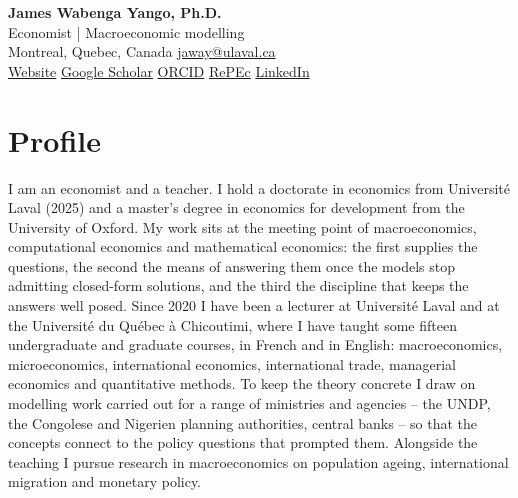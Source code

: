 \documentclass[11pt,letterpaper]{article}
\newcommand{\dotsep}{\;\textcolor{soft}{\textbullet}\;}
\begin{document}
\sloppy
\begin{center}
  {\selectfont\Huge\bfseries\color{accent} James Wabenga Yango, Ph.D.}\\[3pt]
  {\selectfont\large Economist \textcolor{soft}{|} Macroeconomic modelling}\\[6pt]
  {\small
    Montreal, Quebec, Canada \dotsep \href{mailto:jaway@ulaval.ca}{jaway@ulaval.ca}\\[2pt]
    \href{https://jamwab.github.io}{Website} \dotsep
    \href{https://scholar.google.com/citations?user=1d2zZn8AAAAJ}{Google Scholar} \dotsep
    \href{https://orcid.org/0000-0002-4675-4583}{ORCID} \dotsep
    \href{https://ideas.repec.org/f/pwa745.html}{RePEc} \dotsep
    \href{https://www.linkedin.com/in/james-wabenga-739a6641/}{LinkedIn}
  }
\end{center}
\vspace{0.2em}
\section{Profile}
I am an economist and a teacher. I hold a doctorate in economics from Université Laval (2025) and a master's degree in economics for development from the University of Oxford. My work sits at the meeting point of macroeconomics, computational economics and mathematical economics: the first supplies the questions, the second the means of answering them once the models stop admitting closed-form solutions, and the third the discipline that keeps the answers well posed. Since 2020 I have been a lecturer at Université Laval and at the Université du Québec à Chicoutimi, where I have taught some fifteen undergraduate and graduate courses, in French and in English: macroeconomics, microeconomics, international economics, international trade, managerial economics and quantitative methods. To keep the theory concrete I draw on modelling work carried out for a range of ministries and agencies -- the UNDP, the Congolese and Nigerien planning authorities, central banks -- so that the concepts connect to the policy questions that prompted them. Alongside the teaching I pursue research in macroeconomics on population ageing, international migration and monetary policy.
\end{document}

